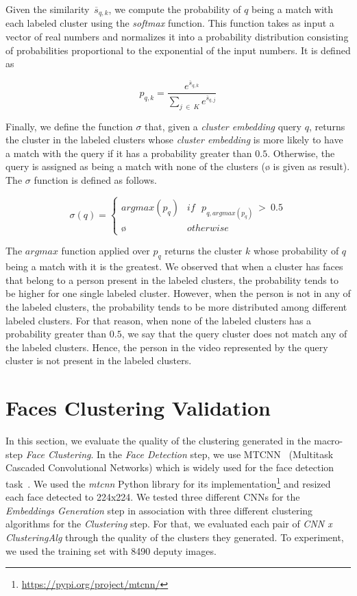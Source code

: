 Given the similarity~$\overline{s}_{q,k}$, we compute the probability of $q$ being a match with each labeled cluster using the \emph{softmax} function.
This function takes as input a vector of real numbers and normalizes it into a probability distribution consisting of probabilities proportional to the exponential of the input numbers. 
It is defined as

\begin{equation}
\label{equation:probability}
    p_{q,k} = \frac{e^{\overline{s}_{q,k}}}{\sum_{j~\in~K}{e^{\overline{s}_{q,j}}}}
\end{equation}

Finally, we define the function $\sigma$ that, given a \emph{cluster embedding} query $q$, returns the cluster in the labeled clusters whose \emph{cluster embedding} is more likely to have a match with the query if it has a probability greater than $0.5$. Otherwise, the query is assigned as being a match with none of the clusters ($\text{\o}$ is given as result). The $\sigma$ function is defined as follows.

\begin{equation}
\label{equation:sigma}
    \sigma{(q)} = \begin{cases}argmax(p_q) & if~~~p_{q,argmax(p_q)}~>~0.5\\\text{\o} & otherwise\end{cases}
\end{equation}

The $argmax$ function applied over $p_q$ returns the cluster $k$ whose probability of $q$ being a match with it is the greatest. 
We observed that when a cluster has faces that belong to a person present in the labeled clusters, the probability tends to be higher for one single labeled cluster.
However, when the person is not in any of the labeled clusters, the probability tends to be more distributed among different labeled clusters.
For that reason, when none of the labeled clusters has a probability greater than $0.5$, we say that the query cluster does not match any of the labeled clusters.
Hence, the person in the video represented by the query cluster is not present in the labeled clusters.

\section{Faces Clustering Validation}
\label{sec:recognition_clustering_validation}

In this section, we evaluate the quality of the clustering generated in the macro-step \emph{Face Clustering}.
In the \emph{Face Detection} step, we use MTCNN~\cite{mtcnn} (Multitask
Cascaded Convolutional Networks) which is widely used for the face detection task~\cite{mtcnn1, mtcnn3}.
We used the  \emph{mtcnn} Python library for its implementation\footnote{\url{https://pypi.org/project/mtcnn/}} and resized each face detected to 224x224.
We tested three different CNNs for the \emph{Embeddings Generation} step in association with three different clustering algorithms for the \emph{Clustering} step.
For that, we evaluated each pair of \emph{CNN x ClusteringAlg} through the quality of the clusters they generated. 
To experiment, we used the training set with 8490 deputy images.

